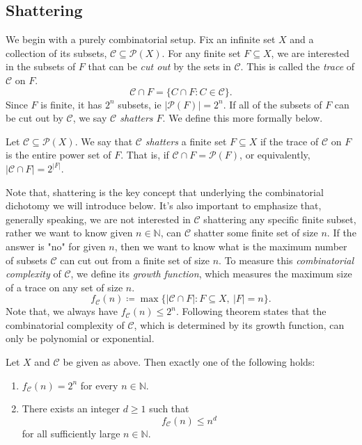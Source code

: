 \subsection{Shattering}

We begin with a purely combinatorial setup. Fix an infinite set $X$ and a collection of its subsets, $\mathcal{C} \subseteq \mathcal{P}(X)$. For any finite set $F\subseteq X$, we are interested in the subsets of $F$ that can be \emph{cut out} by the sets in $\mathcal{C}$. This is called the \emph{trace} of $\mathcal{C}$ on $F$.
\[
    \mathcal{C}\cap F=\{C\cap F:C\in\mathcal{C}\}.
\]
Since $F$ is finite, it has $2^n$ subsets, ie $|\mathcal{P}(F)| = 2^n$. If all of the subsets of $F$ can be cut out by $\mathcal{C}$, we say \emph{$\mathcal{C}$ shatters $F$}. We define this more formally below.

\begin{definition}[Shattering]
    Let $\mathcal{C} \subseteq \mathcal{P}(X)$. We say that $\mathcal{C}$ \emph{shatters} a finite set $F \subseteq X$ if the trace of $\mathcal{C}$ on $F$ is the entire power set of $F$. That is, if $\mathcal{C} \cap F = \mathcal{P}(F)$, or equivalently, $|\mathcal{C} \cap F| = 2^{|F|}$.
\end{definition}

Note that, shattering is the key concept that underlying the combinatorial dichotomy we will introduce below. It's also important to emphasize that, generally speaking, we are not interested in $\mathcal{C}$ shattering any specific finite subset, rather we want to know given $n\in \mathbb{N}$, can $\mathcal{C}$ shatter some finite set of size $n$. If the answer is "no" for given $n$, then we want to know what is the maximum number of subsets $\mathcal{C}$ can cut out from a finite set of size $n$. To measure this \textit{combinatorial complexity} of $\mathcal{C}$, we define its \emph{growth function}, which measures the maximum size of a trace on any set of size $n$.
\begin{equation}\label{eq:growth-func-def-1}
f_{\mathcal{C}}(n)\coloneq\max\bigl\{|\mathcal{C}\cap F|:F\subseteq X,\ |F|=n\bigr\}.
\end{equation}
Note that, we always have $f_{\mathcal{C}}(n) \le 2^n$. Following theorem states that the combinatorial complexity of $\mathcal{C}$, which is determined by its growth function, can only be polynomial or exponential.

\begin{theorem}
    \label{thm:vc-dichotomy}
    Let $X$ and $\mathcal{C}$ be given as above. Then exactly one of the following holds:
    \begin{enumerate}[label=(\roman*)]
        \item $f_{\mathcal{C}}(n)=2^{n}$ for every $n\in\mathbb{N}$.
        \item There exists an integer $d\ge 1$ such that
        \[
            f_{\mathcal{C}}(n)\le n^d
        \]
        for all sufficiently large $n \in \mathbb{N}$.
    \end{enumerate}
\end{theorem}

